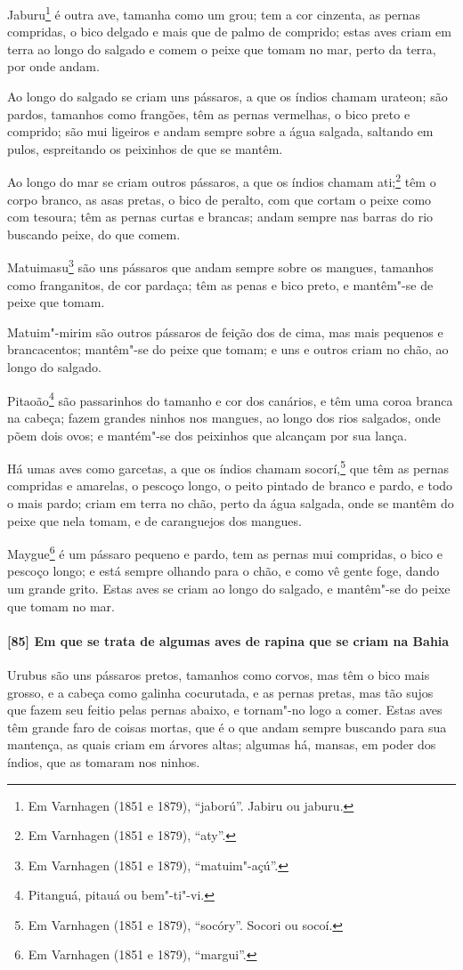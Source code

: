 Jaburu\footnote{ Em Varnhagen (1851 e 1879), ``jaború''. Jabiru ou jaburu.} é outra ave,
tamanha como um grou; tem a cor cinzenta, as pernas compridas, o bico delgado e mais que
de palmo de comprido; estas aves criam em terra ao longo do salgado e comem o peixe que
tomam no mar, perto da terra, por onde andam.

Ao longo do salgado se criam uns pássaros, a que os índios chamam urateon; são pardos,
tamanhos como frangões, têm as pernas vermelhas, o bico preto e comprido; são mui ligeiros
e andam sempre sobre a água salgada, saltando em pulos, espreitando os peixinhos de que se
mantêm.

Ao longo do mar se criam outros pássaros, a que os índios chamam ati;\footnote{ Em
Varnhagen (1851 e 1879), ``aty''.} têm o corpo branco, as asas pretas, o bico de
peralto, com que cortam o peixe como com tesoura; têm as pernas curtas e brancas; andam
sempre nas barras do rio buscando peixe, do que comem.

Matuimasu\footnote{ Em Varnhagen (1851 e 1879), ``matuim"-açú''.} são uns pássaros que
andam sempre sobre os mangues, tamanhos como franganitos, de cor pardaça; têm as penas e
bico preto, e mantêm"-se de peixe que tomam.

Matuim"-mirim são outros pássaros de feição dos de cima, mas mais pequenos e brancacentos;
mantêm"-se do peixe que tomam; e uns e outros criam no chão, ao longo do salgado.

Pitaoão\footnote{ Pitanguá, pitauá ou bem"-ti"-vi.} são passarinhos do tamanho e cor dos
canários, e têm uma coroa branca na cabeça; fazem grandes ninhos nos mangues, ao longo dos
rios salgados, onde põem dois ovos; e mantém"-se dos peixinhos que alcançam por sua lança.

Há umas aves como garcetas, a que os índios chamam socorí,\footnote{ Em Varnhagen (1851 e
1879), ``socóry''. Socori ou socoí.} que têm as pernas compridas e amarelas, o pescoço
longo, o peito pintado de branco e pardo, e todo o mais pardo; criam em terra no chão,
perto da água salgada, onde se mantêm do peixe que nela tomam, e de caranguejos dos
mangues.

Maygue\footnote{ Em Varnhagen (1851 e 1879), ``margui''.} é um pássaro pequeno e pardo,
tem as pernas mui compridas, o bico e pescoço longo; e está sempre olhando para o chão, e
como vê gente foge, dando um grande grito. Estas aves se criam ao longo do salgado, e
mantêm"-se do peixe que tomam no mar.

\paragraph{[85] Em que se trata de algumas aves de rapina que se criam na Bahia}\quad
Urubus são uns pássaros pretos, tamanhos como corvos, mas têm o bico mais grosso, e a
cabeça como galinha cocurutada, e as pernas pretas, mas tão sujos que fazem seu feitio
pelas pernas abaixo, e tornam"-no logo a comer. Estas aves têm grande faro de coisas
mortas, que é o que andam sempre buscando para sua mantença, as quais criam em árvores
altas; algumas há, mansas, em poder dos índios, que as tomaram nos ninhos.

